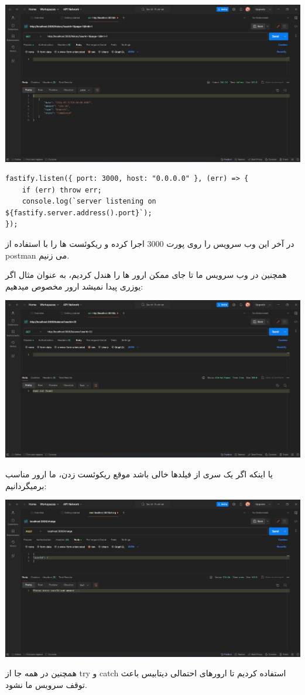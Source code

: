 \qquad \qquad \qquad \includegraphics[width=0.7\linewidth]{figs/api5.jpg}
\setLTR
\begin{lstlisting}    
fastify.listen({ port: 3000, host: "0.0.0.0" }, (err) => {
    if (err) throw err;
    console.log(`server listening on ${fastify.server.address().port}`);
});    
\end{lstlisting}
\setRTL

در آخر این وب سرویس را روی پورت 3000 اجرا کرده و ریکوئست ها را با استفاده از postman می زنیم.

\pagebreak

همچنین در وب سرویس ما تا جای ممکن ارور ها را هندل کردیم، به عنوان مثال اگر یوزری پیدا نمیشد ارور مخصوص میدهیم:

\qquad \qquad \qquad \includegraphics[width=0.7\linewidth]{figs/api6.jpg}


یا اینکه اگر یک سری از فیلدها خالی باشد موقع ریکوئست زدن، ما ارور مناسب برمیگردانیم:

\qquad \qquad \qquad \includegraphics[width=0.7\linewidth]{figs/api7.jpg}



همچنین در همه جا از try و catch استفاده کردیم تا ارورهای احتمالی دیتابیس باعث توقف سرویس ما نشود.




